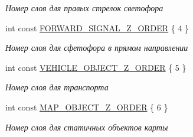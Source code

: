 \begin{Indent}
\begin{DoxyCompactItemize}
\begin{DoxyCompactList}\small\item\em Номер слоя для правых стрелок светофора \end{DoxyCompactList}\item 
\mbox{\label{namespacertm_ab7d75842630fd06af81c5b7af7b121a9}} 
int const \hyperlink{namespacertm_ab7d75842630fd06af81c5b7af7b121a9}{F\+O\+R\+W\+A\+R\+D\+\_\+\+S\+I\+G\+N\+A\+L\+\_\+\+Z\+\_\+\+O\+R\+D\+ER} \{ 4 \}
\begin{DoxyCompactList}\small\item\em Номер слоя для сфетофора в прямом направлении \end{DoxyCompactList}\item 
\mbox{\label{namespacertm_a1f9ff2936d20057085f7b0084e7a20ca}} 
int const \hyperlink{namespacertm_a1f9ff2936d20057085f7b0084e7a20ca}{V\+E\+H\+I\+C\+L\+E\+\_\+\+O\+B\+J\+E\+C\+T\+\_\+\+Z\+\_\+\+O\+R\+D\+ER} \{ 5 \}
\begin{DoxyCompactList}\small\item\em Номер слоя для транспорта \end{DoxyCompactList}\item 
\mbox{\label{namespacertm_a93638d5f93c88f66fa540452aba5d658}} 
int const \hyperlink{namespacertm_a93638d5f93c88f66fa540452aba5d658}{M\+A\+P\+\_\+\+O\+B\+J\+E\+C\+T\+\_\+\+Z\+\_\+\+O\+R\+D\+ER} \{ 6 \}
\begin{DoxyCompactList}\small\item\em Номер слоя для статичных объектов карты \end{DoxyCompactList}\end{DoxyCompactItemize}
\end{Indent}
